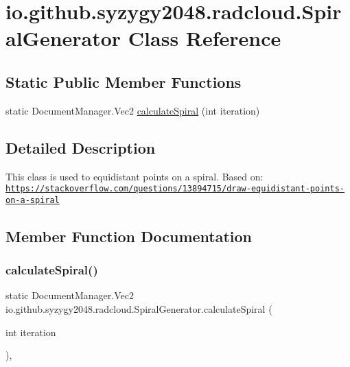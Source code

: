 \hypertarget{classio_1_1github_1_1syzygy2048_1_1radcloud_1_1_spiral_generator}{}\section{io.\+github.\+syzygy2048.\+radcloud.\+Spiral\+Generator Class Reference}
\label{classio_1_1github_1_1syzygy2048_1_1radcloud_1_1_spiral_generator}
\subsection*{Static Public Member Functions}
\begin{DoxyCompactItemize}
\item 
static Document\+Manager.\+Vec2 \mbox{\hyperlink{classio_1_1github_1_1syzygy2048_1_1radcloud_1_1_spiral_generator_afecbb70e7e893866ce0bf01260734f5e}{calculate\+Spiral}} (int iteration)
\end{DoxyCompactItemize}


\subsection{Detailed Description}
This class is used to equidistant points on a spiral. Based on\+: \href{https://stackoverflow.com/questions/13894715/draw-equidistant-points-on-a-spiral}{\tt https\+://stackoverflow.\+com/questions/13894715/draw-\/equidistant-\/points-\/on-\/a-\/spiral} 

\subsection{Member Function Documentation}
\mbox{\label{classio_1_1github_1_1syzygy2048_1_1radcloud_1_1_spiral_generator_afecbb70e7e893866ce0bf01260734f5e}} 
\subsubsection{\texorpdfstring{calculate\+Spiral()}{calculateSpiral()}}
{\footnotesize\ttfamily static Document\+Manager.\+Vec2 io.\+github.\+syzygy2048.\+radcloud.\+Spiral\+Generator.\+calculate\+Spiral (\begin{DoxyParamCaption}\item[{int}]{iteration }\end{DoxyParamCaption})\hspace{0.3cm}{\ttfamily [inline]}, {\ttfamily [static]}}

